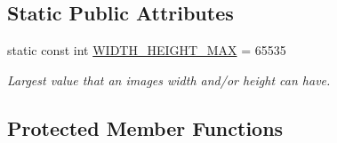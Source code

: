 \subsection*{Static Public Attributes}
\begin{DoxyCompactItemize}
\item 
static const int \mbox{\hyperlink{classGCanvas_a9150dbfb90e715487461a8c07850871e}{W\+I\+D\+T\+H\+\_\+\+H\+E\+I\+G\+H\+T\+\_\+\+M\+AX}} = 65535
\begin{DoxyCompactList}\small\item\em Largest value that an image\textquotesingle{}s width and/or height can have. \end{DoxyCompactList}\end{DoxyCompactItemize}
\subsection*{Protected Member Functions}
